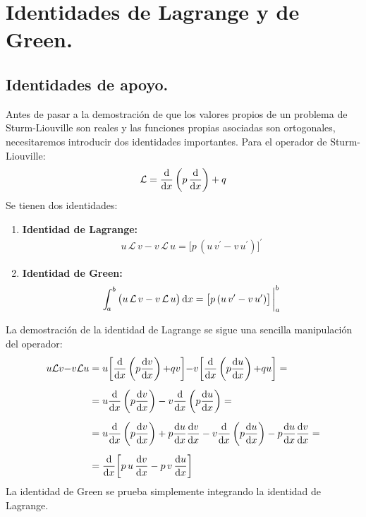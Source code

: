 \documentclass[12pt]{article}
\newcommand{\pderivada}[1]{\ensuremath{{#1}^{\prime}}}
\def\scaleint#1{\vcenter{\hbox{\scaleto[3ex]{\displaystyle\int}{#1}}}}
\def\bs{\mkern-12mu}
\numberwithin{equation}{section}
\begin{document}
\section{Identidades de Lagrange y de Green.}
\subsection{Identidades de apoyo.}

Antes de pasar a la demostración de que los valores propios de un problema de Sturm-Liouville son reales y las funciones propias asociadas son ortogonales,  necesitaremos introducir dos identidades importantes. Para el operador de Sturm-Liouville:
\begin{align*}
\mathcal{L} = \dv{x} \left( p \, \dv{x} \right) + q
\end{align*}
Se tienen dos identidades:
\begin{enumerate}
\item \textbf{Identidad de Lagrange:} 
\begin{align*}
u \, \mathcal{L} \, v - v \, \mathcal{L} \, u = \big[ p \, (u \, \pderivada{v} - v \, \pderivada{u}) \big]^{\prime}
\end{align*}
\item \textbf{Identidad de Green:} 
\begin{align*}
\scaleint{5ex}_{\bs a}^{b} \, \big(u \, \mathcal{L} \, v - v \, \mathcal{L} \, u \big) \dd{x} = \big[ p \, (u \, \pderivada{v} - v \, \pderivada{u}) \big]\eval_{a}^{b}
\end{align*}
\end{enumerate}

La demostración de la identidad de Lagrange se sigue una sencilla manipulación del operador:
\begin{eqnarray}
\begin{aligned}[b]
u  \mathcal{L} v {-} v \mathcal{L} u &= u \bigg[ \dv{x} \left( p \dv{v}{x} \right) {+} q v \bigg] {-} v \bigg[ \dv{x} \left( p \dv{u}{x} \right) {+} q u \bigg] = \\[0.5em] 
&= u \dv{x} \left( p \dv{v}{x} \right) - v \dv{x} \left( p \dv{u}{x} \right) = \\[0.5em]
&= u \dv{x} \left( p \dv{v}{x} \right) + p \dv{u}{x} \dv{v}{x} - v \dv{x} \left( p \dv{u}{x} \right) - p \dv{u}{x} \dv{v}{x} = \\[0.5em] 
&= \dv{x} \bigg[ p \, u \, \dv{v}{x} - p \, v \, \dv{u}{x}  \bigg]
\end{aligned}
\label{eq:ecuacion_04_21}
\end{eqnarray}
La identidad de Green se prueba simplemente integrando la identidad de Lagrange.
    
\end{document}
